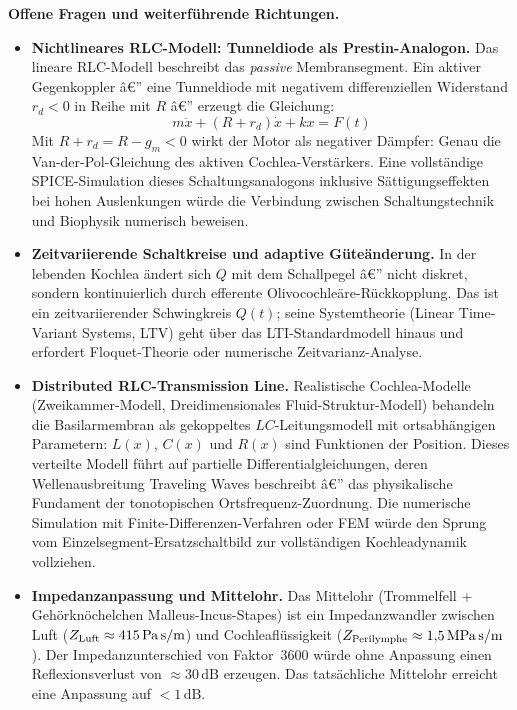 ﻿\documentclass[12pt,a4paper,titlepage]{report}
\begin{document}
\textbf{Offene Fragen und weiterführende Richtungen.}
\begin{itemize}[leftmargin=2em]
  \item \textbf{Nichtlineares RLC-Modell: Tunneldiode als Prestin-Analogon.}
    Das lineare RLC-Modell beschreibt das \emph{passive} Membransegment.
    Ein aktiver Gegenkoppler â€” eine Tunneldiode mit negativem
    differenziellen Widerstand $r_d < 0$ in Reihe mit $R$ â€” erzeugt
    die Gleichung:
    \[
      m\ddot{x} + (R + r_d)\dot{x} + kx = F(t)
    \]
    Mit $R + r_d = R - g_m < 0$ wirkt der Motor als negativer Dämpfer:
    Genau die Van-der-Pol-Gleichung des aktiven Cochlea-Verstärkers.
    Eine vollständige SPICE-Simulation dieses Schaltungsanalogons inklusive
    Sättigungseffekten bei hohen Auslenkungen würde die Verbindung zwischen
    Schaltungstechnik und Biophysik numerisch beweisen.
  \item \textbf{Zeitvariierende Schaltkreise und adaptive Güteänderung.}
    In der lebenden Kochlea ändert sich $Q$ mit dem Schallpegel â€”
    nicht diskret, sondern kontinuierlich durch efferente
    Olivocochleäre-Rückkopplung.
    Das ist ein zeitvariierender Schwingkreis $Q(t)$;
    seine Systemtheorie (Linear Time-Variant Systems, LTV)
    geht über das LTI-Standardmodell hinaus und erfordert
    Floquet-Theorie oder numerische Zeitvarianz-Analyse.
  \item \textbf{Distributed RLC-Transmission Line.}
    Realistische Cochlea-Modelle (Zweikammer-Modell, Dreidimensionales
    Fluid-Struktur-Modell) behandeln die Basilarmembran als
    gekoppeltes $LC$-Leitungsmodell mit ortsabhängigen Parametern:
    $L(x)$, $C(x)$ und $R(x)$ sind Funktionen der Position.
    Dieses verteilte Modell führt auf partielle Differentialgleichungen,
    deren Wellenausbreitung Traveling Waves beschreibt â€”
    das physikalische Fundament der tonotopischen Ortsfrequenz-Zuordnung.
    Die numerische Simulation mit Finite-Differenzen-Verfahren
    oder FEM würde den Sprung vom Einzelsegment-Ersatzschaltbild
    zur vollständigen Kochleadynamik vollziehen.
  \item \textbf{Impedanzanpassung und Mittelohr.}
    Das Mittelohr (Trommelfell + Gehörknöchelchen Malleus-Incus-Stapes)
    ist ein Impedanzwandler zwischen Luft
    ($Z_{\rm Luft} \approx 415\,\mathrm{Pa\,s/m}$) und
    Cochleaflüssigkeit ($Z_{\rm Perilymphe} \approx 1{,}5\,\mathrm{MPa\,s/m}$).
    Der Impedanzunterschied von Faktor~3600 würde ohne Anpassung
    einen Reflexionsverlust von $\approx 30\,\mathrm{dB}$ erzeugen.
    Das tatsächliche Mittelohr erreicht eine Anpassung auf $< 1\,\mathrm{dB}$.

\end{itemize}
\end{document}
